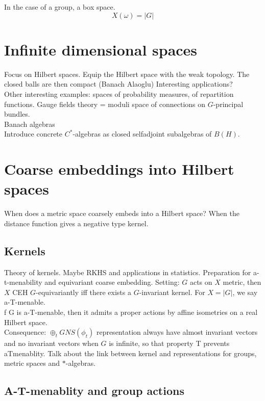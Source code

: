 In the case of a group, a box space.
\[X(\omega) = |G| \]

\section{Infinite dimensional spaces}

Focus on Hilbert spaces. Equip the Hilbert space with the weak topology. The closed balls are then compact (Banach Alaoglu) Interesting applications?\\

Other interesting examples: spaces of probability measures, of repartition functions. Gauge fields theory = moduli space of connections on $G$-principal bundles.\\

Banach algebras\\
Introduce concrete $C^*$-algebras as closed selfadjoint subalgebras of $B(H)$.\\

\section{Coarse embeddings into Hilbert spaces}

When does a metric space coarsely embeds into a Hilbert space? When the distance function gives a negative type kernel.\\

\subsection{Kernels}

Theory of kernels. Maybe RKHS and applications in statistics. Preparation for a-t-menability and equivariant coarse embedding. Setting: $G$ acts on $X$ metric, then $X$ CEH $G$-equivariantly iff there exists a $G$-invariant kernel. For $X= |G|$, we say a-T-menable. \\

f G is a-T-menable, then it admits a proper actions by affine isometries on a real Hilbert space.\\

Consequence: $\oplus_t GNS(\phi_t)$ representation always have almost invariant vectors and no invariant vectors when $G$ is infinite, so that property T prevents aTmenablity. Talk about the link between kernel and representations for groups, metric spaces and $*$-algebras.\\

\subsection{A-T-menablity and group actions}

